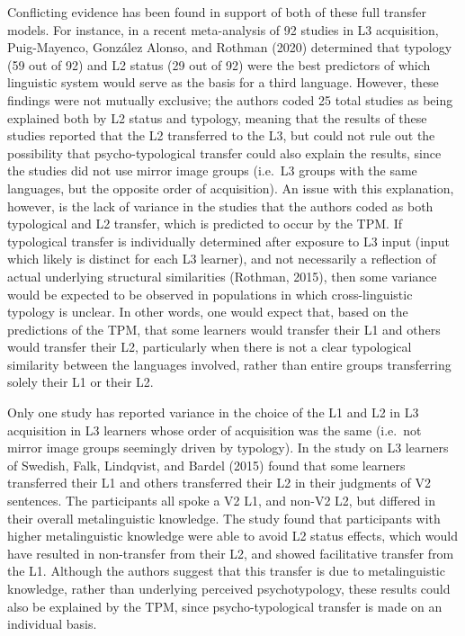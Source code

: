 \documentclass[
  english,
  man]{apa6}
\begin{document}
Conflicting evidence has been found in support of both of these full transfer models.
For instance, in a recent meta-analysis of 92 studies in L3 acquisition, Puig-Mayenco, González Alonso, and Rothman (2020) determined that typology (59 out of 92) and L2 status (29 out of 92) were the best predictors of which linguistic system would serve as the basis for a third language.
However, these findings were not mutually exclusive; the authors coded 25 total studies as being explained both by L2 status and typology, meaning that the results of these studies reported that the L2 transferred to the L3, but could not rule out the possibility that psycho-typological transfer could also explain the results, since the studies did not use mirror image groups (i.e.~L3 groups with the same languages, but the opposite order of acquisition).
An issue with this explanation, however, is the lack of variance in the studies that the authors coded as both typological and L2 transfer, which is predicted to occur by the TPM.
If typological transfer is individually determined after exposure to L3 input (input which likely is distinct for each L3 learner), and not necessarily a reflection of actual underlying structural similarities (Rothman, 2015), then some variance would be expected to be observed in populations in which cross-linguistic typology is unclear.
In other words, one would expect that, based on the predictions of the TPM, that some learners would transfer their L1 and others would transfer their L2, particularly when there is not a clear typological similarity between the languages involved, rather than entire groups transferring solely their L1 or their L2.

Only one study has reported variance in the choice of the L1 and L2 in L3 acquisition in L3 learners whose order of acquisition was the same (i.e.~not mirror image groups seemingly driven by typology).
In the study on L3 learners of Swedish, Falk, Lindqvist, and Bardel (2015) found that some learners transferred their L1 and others transferred their L2 in their judgments of V2 sentences. The participants all spoke a V2 L1, and non-V2 L2, but differed in their overall metalinguistic knowledge.
The study found that participants with higher metalinguistic knowledge were able to avoid L2 status effects, which would have resulted in non-transfer from their L2, and showed facilitative transfer from the L1. Although the authors suggest that this transfer is due to metalinguistic knowledge, rather than underlying perceived psychotypology, these results could also be explained by the TPM, since psycho-typological transfer is made on an individual basis.
\end{document}
